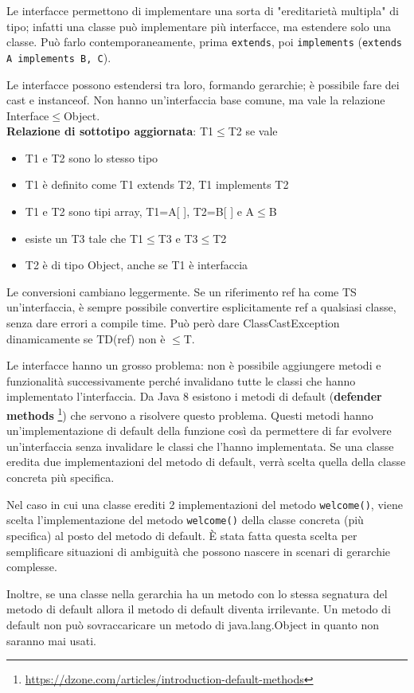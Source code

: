 Le interfacce permettono di implementare una sorta di "ereditarietà multipla" di tipo; infatti una classe può implementare più interfacce, ma estendere solo una classe. Può farlo contemporaneamente, prima \texttt{extends}, poi \texttt{implements} (\texttt{extends A implements B, C}).

Le interfacce possono estendersi tra loro, formando gerarchie; è possibile fare dei cast e instanceof. Non hanno un'interfaccia base comune, ma vale la relazione Interface$\le$Object. \\
\textbf{Relazione di sottotipo aggiornata}: T1$\le$T2 se vale
\begin{itemize}
\item T1 e T2 sono lo stesso tipo
\item T1 è definito come T1 extends T2, T1 implements T2
\item T1 e T2 sono tipi array, T1=A[ ], T2=B[ ] e A$\le$B
\item esiste un T3 tale che T1$\le$T3 e T3$\le$T2
\item T2 è di tipo Object, anche se T1 è interfaccia
\end{itemize}
Le conversioni cambiano leggermente. Se un riferimento ref ha come TS un'interfaccia, è sempre possibile convertire esplicitamente ref a qualsiasi classe, senza dare errori a compile time. Può però dare ClassCastException dinamicamente se TD(ref) non è $\le$T.

Le interfacce hanno un grosso problema: non è possibile aggiungere metodi e funzionalità successivamente perché invalidano tutte le classi che hanno implementato l'interfaccia. Da Java 8 esistono i metodi di default (\textbf{defender methods} \footnote{\url{https://dzone.com/articles/introduction-default-methods}}) che servono a risolvere questo problema. Questi metodi hanno un'implementazione di default della funzione così da permettere di far evolvere un'interfaccia senza invalidare le classi che l'hanno implementata. Se una classe eredita due implementazioni del metodo di default, verrà scelta quella della classe concreta più specifica.

Nel caso in cui una classe erediti 2 implementazioni del metodo \texttt{welcome()}, viene scelta l’implementazione del metodo \texttt{welcome()} della classe concreta (pi\`u specifica) al posto del metodo di default. \`E stata fatta questa scelta per semplificare situazioni di ambiguit\`a che possono nascere in scenari
di gerarchie complesse.

Inoltre, se una classe nella gerarchia ha un metodo con lo stessa segnatura del metodo di default allora il metodo di default diventa irrilevante. Un metodo di default non pu\`o sovraccaricare un metodo di java.lang.Object in quanto non saranno mai usati.

